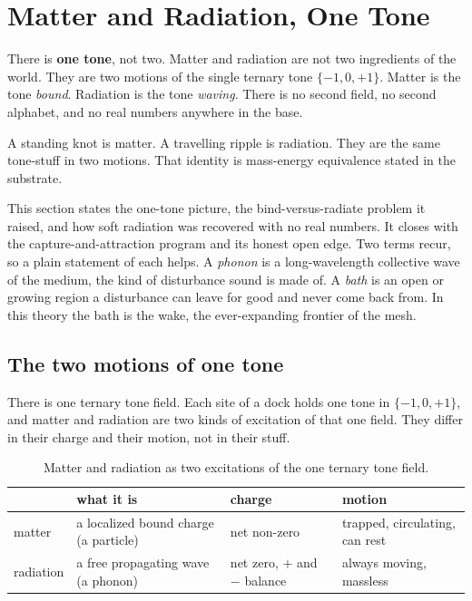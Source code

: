\section{Matter and Radiation, One Tone}

There is \textbf{one tone}, not two. Matter and radiation are not two ingredients of the world. They are two
motions of the single ternary tone $\{-1, 0, +1\}$. Matter is the tone \emph{bound}. Radiation is the tone
\emph{waving}. There is no second field, no second alphabet, and no real numbers anywhere in the base.

\begin{principle}
A standing knot is matter. A travelling ripple is radiation. They are the same tone-stuff in two motions. That
identity is mass-energy equivalence stated in the substrate.
\end{principle}

This section states the one-tone picture, the bind-versus-radiate problem it raised, and how soft radiation was
recovered with no real numbers. It closes with the capture-and-attraction program and its honest open edge. Two
terms recur, so a plain statement of each helps. A \emph{phonon} is a long-wavelength collective wave of the
medium, the kind of disturbance sound is made of. A \emph{bath} is an open or growing region a disturbance can
leave for good and never come back from. In this theory the bath is the wake, the ever-expanding frontier of the
mesh.

\subsection{The two motions of one tone}

There is one ternary tone field. Each site of a dock holds one tone in $\{-1, 0, +1\}$, and matter and radiation
are two kinds of excitation of that one field. They differ in their charge and their motion, not in their stuff.

\begin{table}[ht]
\centering
\begin{tabular}{@{}llll@{}}
\toprule
 & what it is & charge & motion \\
\midrule
matter & a localized bound charge (a particle) & net non-zero & trapped, circulating, can rest \\
radiation & a free propagating wave (a phonon) & net zero, $+$ and $-$ balance & always moving, massless \\
\bottomrule
\end{tabular}
\caption{Matter and radiation as two excitations of the one ternary tone field.}
\label{tab:two-motions}
\end{table}

